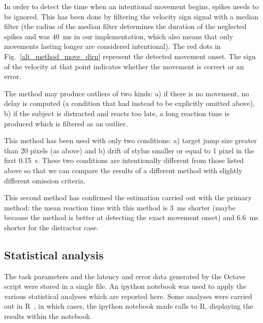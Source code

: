 \documentclass[10pt,letterpaper]{article}
\newcommand{\filename}[1]{\textsf{\textbf{#1}}}
\begin{document}
In order to detect the time when an intentional movement begins,
spikes needs to be ignored. This has been done by filtering the
velocity sign signal with a median filter (the radius of the median
filter determines the duration of the neglected spikes and was 40~ms
in our implementation, which also means that only movements lasting
longer are considered intentional). The red dots in
Fig.~\ref{alt_method_move_dirn} represent the detected movement
onset. The sign of the velocity at that point indicates whether the
movement is correct or an error.

The method may produce outliers of two kinds: a) if there is no
movement, no delay is computed (a condition that had instead to be
explicitly omitted above), b) if the subject is distracted and reacts
too late, a long reaction time is produced which is filtered as an
outlier.

This method has been used with only two conditions: a) target
jump size greater than 20 pixels (as above) and b) drift of stylus
smaller or equal to 1 pixel in the first 0.15~s. These two conditions
are intentionally different from those listed above so that we can
compare the results of a different method with slightly different
omission criteria.

This second method has confirmed the estimation carried out with the
primary method: the mean reaction time with this method is 3~ms
shorter (maybe because the method is better at detecting the exact
movement onset) and 6.6~ms shorter for the distractor case.

\subsection*{Statistical analysis}

%
The task parameters and the latency and error data generated by the
Octave script were stored in a single file. An ipython notebook was
used to apply the various statistical analyses which are reported
here. Some analyses were carried out in R~\cite{r_core_team_r:_2013},
in which cases, the ipython notebook made calls to R, displaying the
results within the notebook.
\end{document}
